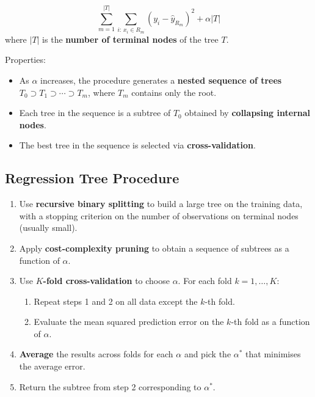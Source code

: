 \documentclass[11pt,a4paper]{article}
\theoremstyle{definition}
\theoremstyle{plain}
\theoremstyle{remark}
\begin{document}
\begin{tcolorbox}[colback=blue!5!white,colframe=blue!75!black,title=\textbf{Cost-Complexity Criterion}]
\[
    \sum_{m=1}^{|T|} \sum_{i:\, x_i \in R_m} (y_i - \hat{y}_{R_m})^2 + \alpha |T|
\]
where $|T|$ is the \textbf{number of terminal nodes} of the tree $T$.
\end{tcolorbox}

Properties:
\begin{itemize}
    \item As $\alpha$ increases, the procedure generates a \textbf{nested sequence of trees} $T_0 \supset T_1 \supset \cdots \supset T_m$, where $T_m$ contains only the root.
    \item Each tree in the sequence is a subtree of $T_0$ obtained by \textbf{collapsing internal nodes}.
    \item The best tree in the sequence is selected via \textbf{cross-validation}.
\end{itemize}

\subsection{Regression Tree Procedure}

\begin{tcolorbox}[colback=green!5!white,colframe=green!75!black,title=\textbf{Full Algorithm for Regression Trees}]
\begin{enumerate}
    \item Use \textbf{recursive binary splitting} to build a large tree on the training data, with a stopping criterion on the number of observations on terminal nodes (usually small).
    \item Apply \textbf{cost-complexity pruning} to obtain a sequence of subtrees as a function of $\alpha$.
    \item Use \textbf{$K$-fold cross-validation} to choose $\alpha$. For each fold $k = 1, \ldots, K$:
    \begin{enumerate}
        \item Repeat steps 1 and 2 on all data except the $k$-th fold.
        \item Evaluate the mean squared prediction error on the $k$-th fold as a function of $\alpha$.
    \end{enumerate}
    \item \textbf{Average} the results across folds for each $\alpha$ and pick the $\alpha^*$ that minimises the average error.
    \item Return the subtree from step 2 corresponding to $\alpha^*$.
\end{enumerate}
\end{tcolorbox}
\end{document}
